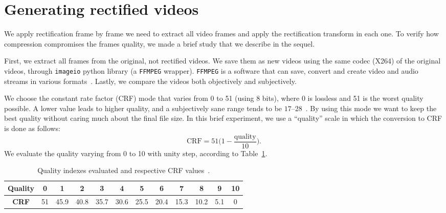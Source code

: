   \section{Generating rectified videos}
  We apply rectification frame by frame \ie
  we need to extract all video frames and apply the rectification transform in each one.
  To verify how compression compromises the frames quality, we made a brief study that we describe in the sequel.

  First, we extract all frames from the original, not rectified videos.
  We save them as new videos using the same codec (X264) of the original videos, through
  \verb|imageio| python library (a \verb|FFMPEG| wrapper).
  \verb|FFMPEG| is a software that can save, convert and create video and audio streams in various formats~\cite{web:ffmpeg}.
  Lastly, we compare the videos both objectively and subjectively.


  We choose the constant rate factor (CRF)
  mode that varies from 0 to 51 (using 8 bits), where 0 is lossless and 51 is the worst quality possible.
  A lower value leads to higher quality, and a subjectively sane range tends to be $17$--$28$~\cite{web:ffmpeg}.
  By using this mode we want to keep the best quality without caring much about the final file size.
  In this brief experiment, we use a “quality” scale in which the conversion to CRF is done as follows:
  \begin{equation}
     \textrm{CRF} = 51\bigg(1 - \frac{\textrm{quality}}{10}\bigg).
    \end{equation}
  We evaluate the quality varying from 0 to 10 with unity step, according to Table~\ref{tab:crfxqual}.
%
\begin{table}[htb!]
\centering
\begin{tabular}{@{}cccccccccccc@{}}
\toprule
\textbf{Quality} & 0  & 1    & 2    & 3    & 4    & 5    & 6    & 7    & 8    & 9   & 10 \\ \midrule
\textbf{CRF}     & 51 & 45.9 & 40.8 & 35.7 & 30.6 & 25.5 & 20.4 & 15.3 & 10.2 & 5.1 & 0  \\ \bottomrule
\end{tabular}
\caption{Quality indexes evaluated and respective CRF values~\cite{web:ffmpeg}.}
\label{tab:crfxqual}
\end{table}


